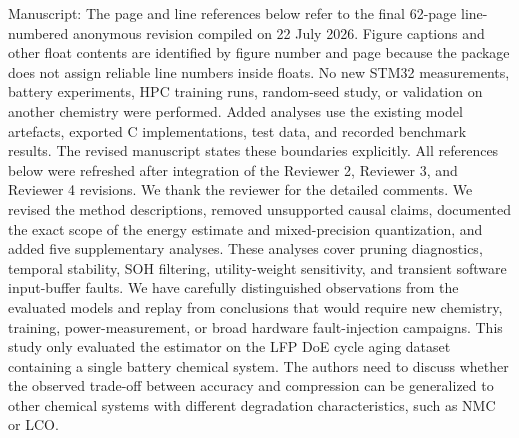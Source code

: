\markdownRendererDocumentBegin
\markdownRendererSectionBegin
{}\markdownRendererInterblockSeparator
{}Manuscript: \markdownRendererParagraphSeparator
{}The page and line references below refer to the final 62-page line-numbered anonymous revision compiled on 22 July 2026. Figure captions and other float contents are identified by figure number and page because the  package does not assign reliable line numbers inside floats. No new STM32 measurements, battery experiments, HPC training runs, random-seed study, or validation on another chemistry were performed. Added analyses use the existing model artefacts, exported C implementations, test data, and recorded benchmark results. The revised manuscript states these boundaries explicitly. All references below were refreshed after integration of the Reviewer 2, Reviewer 3, and Reviewer 4 revisions.\markdownRendererInterblockSeparator
{}\markdownRendererSectionBegin
{}\markdownRendererInterblockSeparator
{}We thank the reviewer for the detailed comments. We revised the method descriptions, removed unsupported causal claims, documented the exact scope of the energy estimate and mixed-precision quantization, and added five supplementary analyses. These analyses cover pruning diagnostics, temporal stability, SOH filtering, utility-weight sensitivity, and transient software input-buffer faults. We have carefully distinguished observations from the evaluated models and replay from conclusions that would require new chemistry, training, power-measurement, or broad hardware fault-injection campaigns.\markdownRendererInterblockSeparator
{}
\markdownRendererSectionEnd \markdownRendererSectionBegin
{}\markdownRendererInterblockSeparator
{}\markdownRendererBlockQuoteBegin
This study only evaluated the estimator on the LFP DoE cycle aging dataset containing a single battery chemical system. The authors need to discuss whether the observed trade-off between accuracy and compression can be generalized to other chemical systems with different degradation characteristics, such as NMC or LCO.\markdownRendererBlockQuoteEnd \markdownRendererInterblockSeparator
